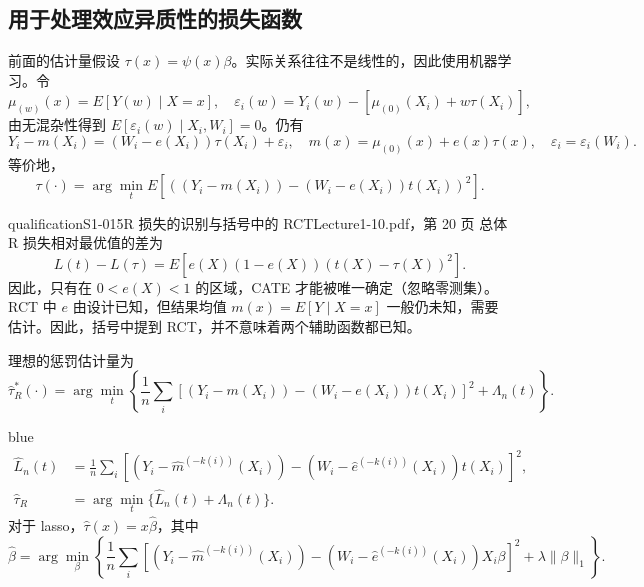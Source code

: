 \subsection{用于处理效应异质性的损失函数}
前面的估计量假设 $\tau(x)=\psi(x)\beta$。实际关系往往不是线性的，因此使用机器学习。令
\[
\mu_{(w)}(x)=E[Y(w)\mid X=x],\quad
\varepsilon_i(w)=Y_i(w)-[\mu_{(0)}(X_i)+w\tau(X_i)],
\]
由无混杂性得到 $E[\varepsilon_i(w)\mid X_i,W_i]=0$。仍有
\[
Y_i-m(X_i)=(W_i-e(X_i))\tau(X_i)+\varepsilon_i,
\quad m(x)=\mu_{(0)}(x)+e(x)\tau(x),\quad \varepsilon_i=\varepsilon_i(W_i).
\]
等价地，
\[
\tau(\cdot)=\arg\min_{t}E[((Y_i-m(X_i))-(W_i-e(X_i))t(X_i))^2].
\]
\begin{reviewnote}{qualification}{S1-015}{R 损失的识别与括号中的 RCT}{Lecture1-10.pdf，第 20 页}
总体 R 损失相对最优值的差为
\[
L(t)-L(\tau)=E[e(X)(1-e(X))(t(X)-\tau(X))^2].
\]
因此，只有在 $0<e(X)<1$ 的区域，CATE 才能被唯一确定（忽略零测集）。RCT 中 $e$ 由设计已知，但结果均值 $m(x)=E[Y\mid X=x]$ 一般仍未知，需要估计。因此，括号中提到 RCT，并不意味着两个辅助函数都已知。
\end{reviewnote}
理想的惩罚估计量为
\[
\widehat\tau_R^*(\cdot)=\arg\min_t\left\{
\frac1n\sum_i[(Y_i-m(X_i))-(W_i-e(X_i))t(X_i)]^2+\Lambda_n(t)\right\}.
\]
\begin{inkblock}{blue}
\begin{align*}
\widehat L_n(t)&=\frac1n\sum_i
[(Y_i-\widehat m^{(-k(i))}(X_i))-(W_i-\widehat e^{(-k(i))}(X_i))t(X_i)]^2,\\
\widehat\tau_R&=\arg\min_t\{\widehat L_n(t)+\Lambda_n(t)\}.
\end{align*}
对于 lasso，$\widehat\tau(x)=x\widehat\beta$，其中
\[
\widehat\beta=\arg\min_\beta\left\{\frac1n\sum_i
[(Y_i-\widehat m^{(-k(i))}(X_i))-(W_i-\widehat e^{(-k(i))}(X_i))X_i\beta]^2
+\lambda\|\beta\|_1\right\}.
\]
\end{inkblock}

